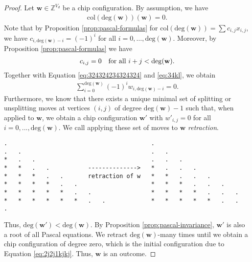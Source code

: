 \begin{proof}
    Let \( \mathbf{w}\in \mathbb{Z}^{V_d} \) be a chip configuration.
    By assumption, we have 
    \begin{align}\label{eq:324324234324324}
        \mathrm{col}(\mathrm{deg}(\mathbf w))(\mathbf w) = 0.
    \end{align}
    Note that by Proposition \ref{prop:pascal-formulas} for \( \mathrm{col}(\mathrm{deg}(\mathbf w)) = \sum c_{i,j} x_{i,j}\), we have \( c_{i,\mathrm{deg}(\mathbf w) - i} = (-1)^{i} \) for all \( i =0, \dots, \mathrm{deg}(\mathbf w) \). Moreover, by Proposition \ref{prop:pascal-formulas} we have 
    \begin{align}\label{eq:34kl}
        c_{i,j} = 0 \quad \text{for all \( i+j < \mathrm{deg}(\mathbf w) \)}.
    \end{align}
      Together with Equation \ref{eq:324324234324324} and \ref{eq:34kl}, we obtain 
    \begin{align}\label{eq:2j2j1kjkj}
        \sum_{i=0}^{\mathrm{deg}(\mathbf w)}(-1)^i w_{i, \mathrm{deg}(\mathbf w) - i} = 0.
    \end{align}
    Furthermore, we know that there exists a unique minimal set of splitting or unsplitting moves at vertices \( (i,j) \) of degree \( \mathrm{deg}(\mathbf w) - 1 \) such that, when applied to \( \mathbf w \), we obtain a chip configuration \( \mathbf w' \) with \( w'_{i,j} = 0 \) for all \( i =0, ... , \mathrm{deg}(\mathbf w) \). We call applying these set of moves to \( \mathbf w \) \emph{retraction}.
    
    \begin{verbatim}
.                                         .
.   .                                     .   .
*   .   .                                 .   .   .
*   *   .   .           -------------->   *   .   .   . 
*   *   *   .   .       retraction of w   *   *   .   .   .
*   *   *   *   .   .                     *   *   *   .   .   .
*   *   *   *   *   .   .                 *   *   *   *   .   .   .   
*   *   *   *   *   *   .   .             *   *   *   *   *   .   .   .   
    \end{verbatim}
    Thus, \( \mathrm{deg}(\mathbf w') < \mathrm{deg}(\mathbf w)  \).
    By Proposition \ref{prop:pascal-invariance}, \( \mathbf w' \) is also a root of all Pascal equations. We retract \( \mathrm{deg}(\mathbf w) \)-many times until we obtain a chip configuration of degree zero, which is the initial configuration due to Equation \ref{eq:2j2j1kjkj}. Thus, \( \mathbf w \) is an outcome.
\end{proof}

